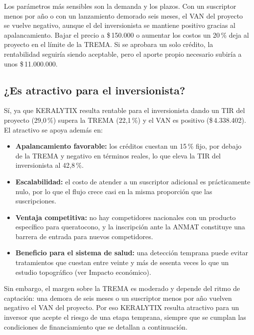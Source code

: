         Los parámetros más sensibles son la demanda y los plazos. Con un suscriptor menos por año o con un lanzamiento demorado seis meses, el VAN del proyecto se vuelve negativo, aunque el del inversionista se mantiene positivo gracias al apalancamiento. Bajar el precio a \$\,150.000 o aumentar los costos un 20\,\% deja al proyecto en el límite de la TREMA. Si se aprobara un solo crédito, la rentabilidad seguiría siendo aceptable, pero el aporte propio necesario subiría a unos \$\,11.000.000.

    \subsection{¿Es atractivo para el inversionista?}
        Sí, ya que KERALYTIX resulta rentable para el inversionista dando un TIR del proyecto (29,0\,\%) supera la TREMA (22,1\,\%) y el VAN es positivo (\$\,4.338.402). El atractivo se apoya además en:

        \begin{itemize}
            \item \textbf{Apalancamiento favorable:} los créditos cuestan un 15\,\% fijo, por debajo de la TREMA y negativo en términos reales, lo que eleva la TIR del inversionista al 42,8\,\%.

            \item \textbf{Escalabilidad:} el costo de atender a un suscriptor adicional es prácticamente nulo, por lo que el flujo crece casi en la misma proporción que las suscripciones.

            \item \textbf{Ventaja competitiva:} no hay competidores nacionales con un producto específico para queratocono, y la inscripción ante la ANMAT constituye una barrera de entrada para nuevos competidores.

            \item \textbf{Beneficio para el sistema de salud:} una detección temprana puede evitar tratamientos que cuestan entre veinte y más de sesenta veces lo que un estudio topográfico (ver Impacto económico).
        \end{itemize}

        Sin embargo, el margen sobre la TREMA es moderado y depende del ritmo de captación: una demora de seis meses o un suscriptor menos por año vuelven negativo el VAN del proyecto. Por eso KERALYTIX resulta atractivo para un inversor que acepte el riesgo de una etapa temprana, siempre que se cumplan las condiciones de financiamiento que se detallan a continuación.

